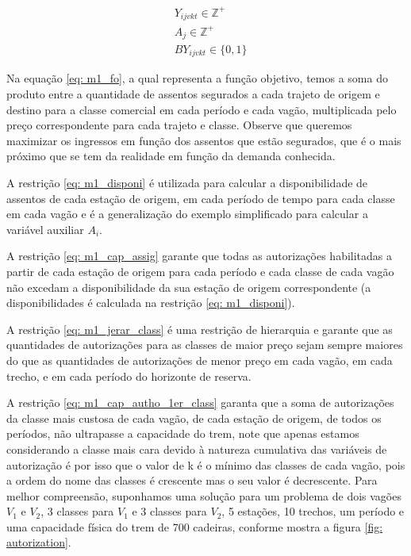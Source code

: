 \begin{align}
	 & Y_{ijvkt} \in \mathbb{Z}^+                                                                                                                                                                                     \label{eq: m1_dom_autho}                                                      \\
	 & A_{j} \in \mathbb{Z}^+                                                                                                                                                                                         \label{eq: m1_dom_disponi}                                                    \\
	 & BY_{ijvkt} \in \{0,1\}                                                                                                                                                                                        \label{eq: m1_dom_bin_nadja}
\end{align}


Na equação \ref{eq: m1_fo}, a qual representa a função objetivo, temos a soma do produto entre a quantidade de assentos segurados a cada trajeto de origem e destino para a classe comercial em cada período e cada vagão, multiplicada pelo preço correspondente para cada trajeto e classe. Observe que queremos maximizar os ingressos em função dos assentos que estão segurados, que é o mais próximo que se tem da realidade em função da demanda conhecida.

A restrição \ref{eq: m1_disponi} é utilizada para calcular a disponibilidade de assentos de cada estação de origem, em cada período de tempo para cada classe em cada vagão e é a generalização do exemplo simplificado para calcular a variável auxiliar $A_i$.

A restrição \ref{eq: m1_cap_assig} garante que todas as autorizações habilitadas a partir de cada estação de origem para cada período e cada classe de cada vagão não excedam a disponibilidade da sua estação de origem correspondente (a disponibilidades é calculada na restrição \ref{eq: m1_disponi}).

A restrição \ref{eq: m1_jerar_class} é uma restrição de hierarquia e garante que as quantidades de autorizações para as classes de maior preço sejam sempre maiores do que as quantidades de autorizações de menor preço em cada vagão, em cada trecho, e em  cada período do horizonte de reserva.

A restrição \ref{eq: m1_cap_autho_1er_class} garanta que a soma de autorizações da classe mais custosa de cada vagão, de cada estação de origem, de todos os períodos, não ultrapasse a capacidade do trem, note que apenas estamos considerando a classe mais cara devido à natureza cumulativa das variáveis de autorização é por isso que o valor de k é o mínimo das classes de cada vagão, pois a ordem do nome das classes é crescente mas o seu valor é decrescente. Para melhor compreensão, suponhamos uma solução para um problema de dois vagões $V_1$ e $V_2$, 3 classes para $V_1$ e 3 classes para $V_2$, 5 estações,  10 trechos, um período e uma capacidade física do trem de 700 cadeiras, conforme mostra a figura \ref{fig: autorization}.


